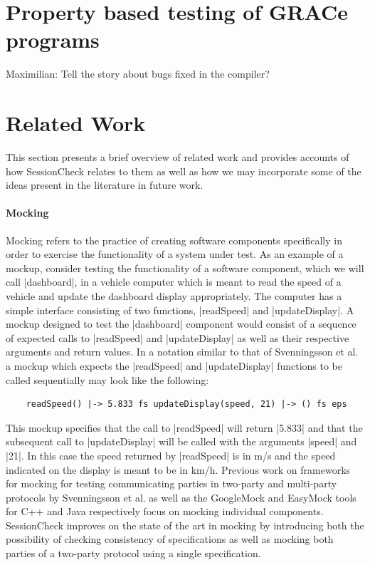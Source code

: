 \documentclass{article}
\begin{document}
\section{Property based testing of GRACe programs}

Maximilian: Tell the story about bugs fixed in the compiler?



\section{Related Work}

This section presents a brief overview of related work and provides accounts
of how SessionCheck relates to them as well as how we may incorporate some of
the ideas present in the literature in future work.

\paragraph{Mocking}

Mocking refers to the practice of creating software components specifically
in order to exercise the functionality of a system under test.
%
As an example of a mockup, consider testing the functionality of a software
component, which we will call |dashboard|, in a vehicle computer which is
meant to read the speed of a vehicle and update the dashboard display
appropriately.
%
The computer has a simple interface consisting of two functions,
|readSpeed| and |updateDisplay|.
%
A mockup designed to test the |dashboard| component would consist of a sequence
of expected calls to |readSpeed| and |updateDisplay| as well as their
respective arguments and return values.
%
In a notation similar to that of Svenningsson et al. \cite{HughesMocking}
a mockup which expects the |readSpeed| and |updateDisplay| functions to be
called sequentially may look like the following:
%
\begin{verbatim}
    readSpeed() |-> 5.833 fs updateDisplay(speed, 21) |-> () fs eps
\end{verbatim}
%
This mockup specifies that the call to |readSpeed| will return |5.833| and that
the subsequent call to |updateDisplay| will be called with the arguments
|speed| and |21|.
%
In this case the speed returned by |readSpeed| is in m/s and the speed indicated
on the display is meant to be in km/h.
%
Previous work on frameworks for mocking for testing communicating parties
in two-party and multi-party protocols by Svenningsson et al. \cite{HughesMocking}
as well as the GoogleMock \cite{GoogleMock} and EasyMock \cite{EasyMock} tools
for C++ and Java respectively focus on mocking individual components.
%
SessionCheck improves on the state of the art in mocking by introducing
both the possibility of checking consistency of specifications as well as
mocking both parties of a two-party protocol using a single specification.
%
\end{document}
